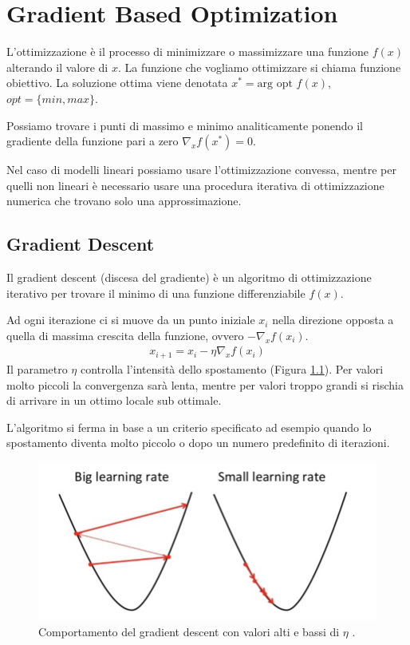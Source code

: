 \chapter{Gradient Based Optimization}
L'ottimizzazione è il processo di minimizzare o massimizzare una funzione $f(x)$ alterando il valore di $x$.
La funzione che vogliamo ottimizzare si chiama funzione obiettivo. La soluzione ottima viene denotata $x^*=\text{arg opt }f(x)$, $opt = \{min, max\} $.

Possiamo trovare i punti di massimo e minimo analiticamente ponendo il gradiente della funzione pari a zero $\nabla_x f(x^*) = 0$.

Nel caso di modelli lineari possiamo usare l'ottimizzazione convessa, mentre per quelli non lineari è necessario
usare una procedura iterativa di ottimizzazione numerica che trovano solo una approssimazione.

\section{Gradient Descent}
Il gradient descent (discesa del gradiente) è un algoritmo di ottimizzazione iterativo per trovare il minimo di una funzione differenziabile $f(x)$.

Ad ogni iterazione ci si muove da un punto iniziale $x_i$ nella direzione opposta a quella di massima crescita della funzione, ovvero $-\nabla_x f(x_i)$.
%
\begin{align*}
  x_{i+1} = x_i - \eta \nabla_x f(x_i)
\end{align*}
Il parametro $\eta$ controlla l'intensità dello spostamento (Figura \ref{fig:learning-rate}). Per valori molto piccoli la convergenza sarà lenta, mentre per valori troppo grandi si rischia di arrivare
in un ottimo locale sub ottimale.

L'algoritmo si ferma in base a un criterio specificato ad esempio quando lo spostamento diventa molto piccolo o dopo un numero predefinito di iterazioni.
\begin{figure}
  \centering
  \includegraphics[width=0.8\linewidth]{images/learning-rate.png}
  \caption{Comportamento del gradient descent con valori alti e bassi di $\eta$ \cite{img:learning-rate}.}
  \label{fig:learning-rate}
\end{figure}

